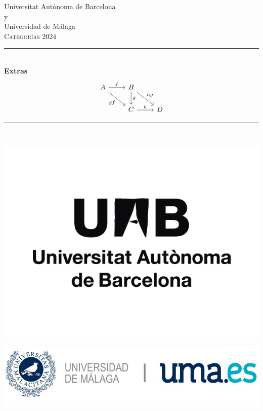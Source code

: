 \documentclass[12pt, a4paper]{article}
\begin{document}
\begin{titlepage}
\center
\vspace*{\fill}

\Large Universitat Aut\`onoma de Barcelona\\%
\Large y\\
\Large Universidad de Málaga\\[1.5cm] %
\textsc{\Large Categorías 2024}\\[0.5cm] %

\rule{\linewidth}{0.5mm} \\[0.4cm]
{ \huge \bfseries Extras}\\[-0.8cm]
\[
\begin{tikzcd}
  A \arrow[r,"f"] \arrow[dr,"gf"swap] & B \arrow[d,"g"] \arrow[dr,"hg"]  \\
& C \arrow[r,"h"] & D
\end{tikzcd}
\]
\rule{\linewidth}{0.5mm} \\[1.5cm]

 



\vspace*{\fill}

\includegraphics[scale=0.25]{Logo_UAB.png}

\vspace*{\fill}

\vspace*{\fill}

\includegraphics[scale=0.25]{Logo_UMA.jpg}

\vspace*{\fill}
\end{titlepage}

\end{document}

